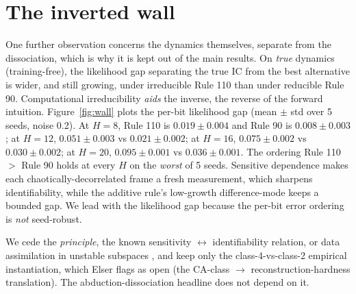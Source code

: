 \documentclass{article}
\begin{document}
\section{The inverted wall}
\label{sec:wall}

One further observation concerns the dynamics themselves, separate from the dissociation, which is why
it is kept out of the main results. On \emph{true} dynamics (training-free), the likelihood
gap separating the true IC from the best alternative is wider, and still growing, under irreducible
Rule 110 than under reducible Rule 90. Computational irreducibility \emph{aids} the inverse, the
reverse of the forward intuition. Figure~\ref{fig:wall} plots the per-bit likelihood gap (mean $\pm$
std over 5 seeds, noise 0.2). At $H=8$, Rule 110 is $0.019 \pm 0.004$ and Rule 90 is $0.008 \pm
0.003$; at $H=12$, $0.051 \pm 0.003$ vs $0.021 \pm 0.002$; at $H=16$, $0.075 \pm 0.002$ vs $0.030 \pm
0.002$; at $H=20$, $0.095 \pm 0.001$ vs $0.036 \pm 0.001$. The ordering Rule 110 $>$ Rule 90 holds at
every $H$ on the \emph{worst} of 5 seeds. Sensitive dependence makes each chaotically-decorrelated
frame a fresh measurement, which sharpens identifiability, while the additive rule's low-growth
difference-mode keeps a bounded gap. We lead with the likelihood gap because the per-bit error
ordering is \emph{not} seed-robust.

We cede the \emph{principle}, the known sensitivity $\leftrightarrow$ identifiability relation, or
data assimilation in unstable subspaces \cite{carrassi}, and keep only the class-4-vs-class-2
empirical instantiation, which Elser \cite{elser} flags as open (the CA-class $\rightarrow$
reconstruction-hardness translation). The abduction-dissociation headline does not depend on it.



% 
\end{document}
